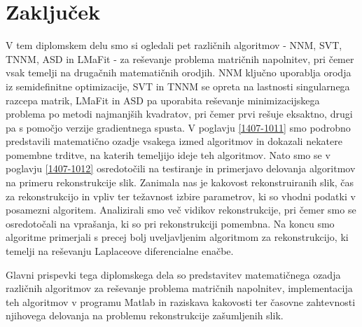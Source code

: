 \chapter{Zaključek}\label{1407-1013}

V tem diplomskem delu smo si ogledali pet različnih algoritmov - NNM, SVT, TNNM, ASD in LMaFit - za reševanje problema matričnih napolnitev, pri čemer vsak temelji na drugačnih matematičnih orodjih.
NNM ključno uporablja orodja iz semidefinitne optimizacije, 
SVT in TNNM se opreta na lastnosti singularnega razcepa matrik, 
LMaFit in ASD pa uporabita reševanje minimizacijskega problema po metodi najmanjših kvadratov, pri čemer prvi rešuje eksaktno, drugi pa s pomočjo verzije gradientnega spusta.
V poglavju \ref{1407-1011} smo podrobno predstavili matematično ozadje vsakega izmed algoritmov
in dokazali nekatere pomembne trditve, na katerih temeljijo ideje teh algoritmov.
Nato smo se v poglavju \ref{1407-1012}
osredotočili na testiranje in primerjavo delovanja algoritmov na primeru rekonstrukcije slik. Zanimala nas je kakovost rekonstruiranih slik, čas za rekonstrukcijo in vpliv ter težavnost izbire parametrov, ki so vhodni podatki v posamezni algoritem.
Analizirali smo več vidikov rekonstrukcije, pri čemer smo se osredotočali na vprašanja, ki so pri rekonstrukciji pomembna. Na koncu smo algoritme primerjali s precej bolj uveljavljenim algoritmom za rekonstrukcijo,
ki temelji na reševanju Laplaceove diferencialne enačbe. 

Glavni prispevki tega diplomskega dela so 
predstavitev matematičnega ozadja različnih algoritmov za reševanje problema matričnih napolnitev,
implementacija teh algoritmov v programu Matlab in raziskava kakovosti ter časovne zahtevnosti njihovega delovanja na problemu rekonstrukcije zašumljenih slik.

